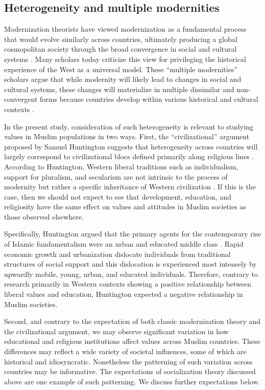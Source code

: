 \documentclass[10pt,letterpaper]{article}
\begin{document}
\subsection*{Heterogeneity and multiple modernities}

Modernization theorists have viewed modernization as a fundamental
process that would evolve similarly across countries, ultimately
producing a global cosmopolitan society through the broad convergence in
social and cultural systems \cite{fukuyama_end_1992}. Many scholars
today criticize this view for privileging the historical experience of
the West as a universal model. These ``multiple modernities'' scholars
argue that while modernity will likely lead to changes in social and
cultural systems, these changes will materialize in multiple dissimilar
and non-convergent forms because countries develop within various
historical and cultural contexts
\cite{hefner_multiple_1998, eisenstadt_multiple_2000, kamali_multiple_2006, casanova_cosmopolitanism_2011}.

In the present study, consideration of such heterogeneity is relevant to
studying values in Muslim populations in two ways. First, the
``civilizational'' argument proposed by Samuel Huntington
suggests that heterogeneity across countries will largely correspond to
civilizational blocs defined primarily along religious lines \cite{huntington_clash_1996}. According
to Huntington, Western liberal traditions such as individualism, support
for pluralism, and secularism are not intrinsic to the process of
modernity but rather a specific inheritance of Western civilization
\cite{huntington_clash_1996}. If this is the case, then
we should not expect to see that development, education, and religiosity
have the same effect on values and attitudes in Muslim societies as
those observed elsewhere.

Specifically, Huntington argued that the primary agents for the
contemporary rise of Islamic fundamentalism were an urban and educated
middle class \cite{huntington_clash_1996}. Rapid economic
growth and urbanization dislocate individuals from traditional
structures of social support and this dislocation is experienced most
intensely by upwardly mobile, young, urban, and educated individuals.
Therefore, contrary to research primarily in Western contexts showing a
positive relationship between liberal values and education, Huntington
expected a negative relationship in Muslim societies.

Second, and contrary to the expectation of both classic modernization
theory and the civilizational argument, we may observe significant
variation in how educational and religious institutions affect values
across Muslim countries. These differences may reflect a wide variety of
societal influences, some of which are historical and idiosyncratic.
Nonetheless the patterning of such variation across countries may be
informative. The expectations of socialization theory discussed above
are one example of such patterning. We discuss further expectations
below.
\end{document}

